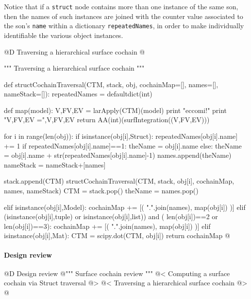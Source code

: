 \documentclass[11pt,oneside]{article}    %
\begin{document}
Notice that if a \texttt{struct} node contains more than one instance of the same son, then the names of such instances are joined with the counter value associated to the son's \texttt{name} within a dictionary \texttt{repeatedNames}, in order to make individually identifiable the various object instances.

@D Traversing a hierarchical surface cochain
@{""" Traversing a hierarchical surface cochain """

def structCochainTraversal(CTM, stack, obj, cochainMap=[], names=[], nameStack=[]):
    repeatedNames = defaultdict(int)
    
    def map(model):
        V,FV,EV = larApply(CTM)(model)
        print "eccomi!"
        print "V,FV,EV =",V,FV,EV 
        return AA(int)(surfIntegration((V,FV,EV)))
    
    for i in range(len(obj)):
        if isinstance(obj[i],Struct):
            repeatedNames[obj[i].name] += 1
            if repeatedNames[obj[i].name]==1: theName = obj[i].name
            else: theName = obj[i].name + str(repeatedNames[obj[i].name]-1)
            names.append(theName)
            nameStack = nameStack+[names]
            
            stack.append(CTM) 
            structCochainTraversal(CTM, stack, obj[i], cochainMap, names, nameStack)
            CTM = stack.pop()
            theName = names.pop()
            
        elif isinstance(obj[i],Model): 
            cochainMap += [( ".".join(names), map(obj[i]) )]
        elif (isinstance(obj[i],tuple) or isinstance(obj[i],list)) and (
              len(obj[i])==2 or len(obj[i])==3):
            cochainMap += [( ".".join(names), map(obj[i]) )]
        elif isinstance(obj[i],Mat): 
            CTM = scipy.dot(CTM, obj[i])
    return cochainMap
@}


\paragraph{Design review}

@D Design review
@{""" Surface cochain review """
@< Computing a surface cochain via Struct traversal @>
@< Traversing a hierarchical surface cochain @>
@}
\end{document}
